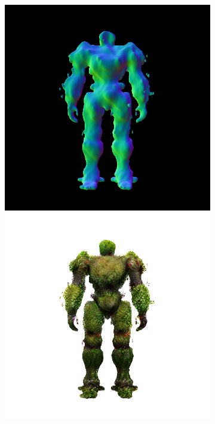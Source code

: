 \begin{figure}[ht]
\begin{subfigure}[b]{0.222\textwidth}
        \includegraphics[width=\textwidth]{etc/a robot made out of plants/magic123/magic123_refine_robot_back_10000_part2.png}
        \includegraphics[width=\textwidth]{etc/a robot made out of plants/magic123/magic123_refine_robot_back_10000_part1.png}

\end{subfigure}
\end{figure}
